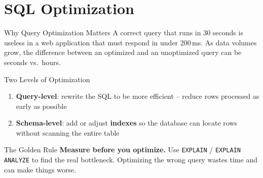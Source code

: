 \section{SQL Optimization}

\begin{frame}{Why Query Optimization Matters}
  A correct query that runs in 30 seconds is useless in a web application that
  must respond in under 200\,ms. As data volumes grow, the difference between
  an optimized and an unoptimized query can be seconds vs.\ hours.

  \begin{block}{Two Levels of Optimization}
    \begin{enumerate}
      \item \textbf{Query-level}: rewrite the SQL to be more efficient --
            reduce rows processed as early as possible
      \item \textbf{Schema-level}: add or adjust \textbf{indexes} so the
            database can locate rows without scanning the entire table
    \end{enumerate}
  \end{block}

  \begin{alertblock}{The Golden Rule}
    \textbf{Measure before you optimize.} Use \texttt{EXPLAIN} /
    \texttt{EXPLAIN ANALYZE} to find the real bottleneck.
    Optimizing the wrong query wastes time and can make things worse.
  \end{alertblock}
\end{frame}


